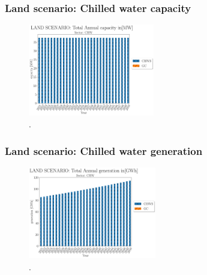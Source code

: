 \begin{frame}
  \frametitle{Land scenario: Chilled water capacity}
  \begin{figure}[htbp!]
    \begin{center}
      \includegraphics[height=4cm]{./images/land scenario_chw_capacity.png}
    \end{center}
    \caption{.} 
    \label{fig:land-chws-cap}
  \end{figure}
\end{frame}

\begin{frame}
  \frametitle{Land scenario: Chilled water generation}
  \begin{figure}[htbp!]
    \begin{center}
      \includegraphics[height=4cm]{./images/land scenario_chw_generation.png}
    \end{center}
    \caption{.} 
    \label{fig:land-chws-gen}
  \end{figure}
\end{frame}
